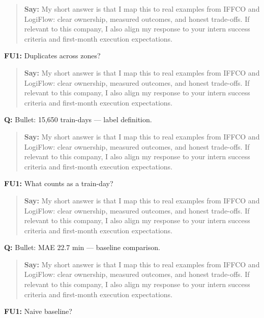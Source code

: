 \documentclass[9pt,a4paper]{article}
\begin{document}
\begin{quote}\small\textbf{Say:} My short answer is that I map this to real examples from IFFCO and LogiFlow: clear ownership, measured outcomes, and honest trade-offs. If relevant to this company, I also align my response to your intern success criteria and first-month execution expectations.\end{quote}
\vspace{2mm}
\textbf{FU1:} Duplicates across zones?

\begin{quote}\small\textbf{Say:} My short answer is that I map this to real examples from IFFCO and LogiFlow: clear ownership, measured outcomes, and honest trade-offs. If relevant to this company, I also align my response to your intern success criteria and first-month execution expectations.\end{quote}
\vspace{2mm}
\textbf{Q:} Bullet: 15,650 train-days --- label definition.

\begin{quote}\small\textbf{Say:} My short answer is that I map this to real examples from IFFCO and LogiFlow: clear ownership, measured outcomes, and honest trade-offs. If relevant to this company, I also align my response to your intern success criteria and first-month execution expectations.\end{quote}
\vspace{2mm}
\textbf{FU1:} What counts as a train-day?

\begin{quote}\small\textbf{Say:} My short answer is that I map this to real examples from IFFCO and LogiFlow: clear ownership, measured outcomes, and honest trade-offs. If relevant to this company, I also align my response to your intern success criteria and first-month execution expectations.\end{quote}
\vspace{2mm}
\textbf{Q:} Bullet: MAE 22.7 min --- baseline comparison.

\begin{quote}\small\textbf{Say:} My short answer is that I map this to real examples from IFFCO and LogiFlow: clear ownership, measured outcomes, and honest trade-offs. If relevant to this company, I also align my response to your intern success criteria and first-month execution expectations.\end{quote}
\vspace{2mm}
\textbf{FU1:} Naive baseline?
\end{document}
